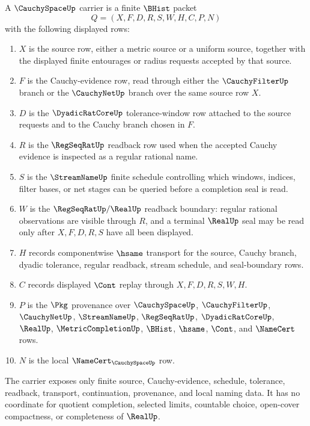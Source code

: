 \begin{definition}
\label{def:cauchy-space-carrier}
A $\CauchySpaceUp$ carrier is a finite $\BHist$ packet
$$
Q=(X,F,D,R,S,W,H,C,P,N)
$$
with the following displayed rows:
\begin{enumerate}
\item $X$ is the source row, either a metric source or a uniform source, together with the displayed finite entourages or radius requests accepted by that source.
\item $F$ is the Cauchy-evidence row, read through either the $\CauchyFilterUp$ branch or the $\CauchyNetUp$ branch over the same source row $X$.
\item $D$ is the $\DyadicRatCoreUp$ tolerance-window row attached to the source requests and to the Cauchy branch chosen in $F$.
\item $R$ is the $\RegSeqRatUp$ readback row used when the accepted Cauchy evidence is inspected as a regular rational name.
\item $S$ is the $\StreamNameUp$ finite schedule controlling which windows, indices, filter bases, or net stages can be queried before a completion seal is read.
\item $W$ is the $\RegSeqRatUp/\RealUp$ readback boundary: regular rational observations are visible through $R$, and a terminal $\RealUp$ seal may be read only after $X,F,D,R,S$ have all been displayed.
\item $H$ records componentwise $\hsame$ transport for the source, Cauchy branch, dyadic tolerance, regular readback, stream schedule, and seal-boundary rows.
\item $C$ records displayed $\Cont$ replay through $X,F,D,R,S,W,H$.
\item $P$ is the $\Pkg$ provenance over $\CauchySpaceUp$, $\CauchyFilterUp$, $\CauchyNetUp$, $\StreamNameUp$, $\RegSeqRatUp$, $\DyadicRatCoreUp$, $\RealUp$, $\MetricCompletionUp$, $\BHist$, $\hsame$, $\Cont$, and $\NameCert$ rows.
\item $N$ is the local $\NameCert_{\CauchySpaceUp}$ row.
\end{enumerate}
The carrier exposes only finite source, Cauchy-evidence, schedule, tolerance, readback, transport, continuation, provenance, and local naming data. It has no coordinate for quotient completion, selected limits, countable choice, open-cover compactness, or completeness of $\RealUp$.
\end{definition}

